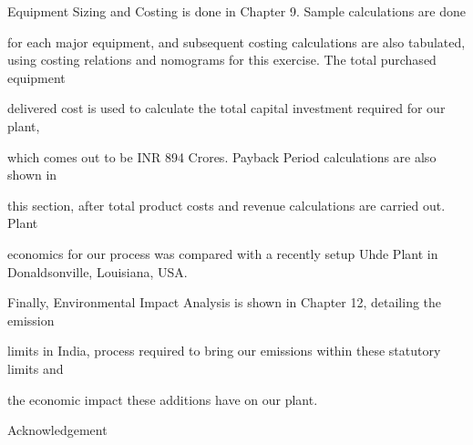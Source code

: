 \documentclass[a4paper,portrait,12pt]{article}
\begin{document}
\begin{flushleft}
Equipment Sizing and Costing is done in Chapter 9. Sample calculations are done
\end{flushleft}


\begin{flushleft}
for each major equipment, and subsequent costing calculations are also tabulated, using costing relations and nomograms for this exercise. The total purchased equipment
\end{flushleft}


\begin{flushleft}
delivered cost is used to calculate the total capital investment required for our plant,
\end{flushleft}


\begin{flushleft}
which comes out to be INR 894 Crores. Payback Period calculations are also shown in
\end{flushleft}


\begin{flushleft}
this section, after total product costs and revenue calculations are carried out. Plant
\end{flushleft}


\begin{flushleft}
economics for our process was compared with a recently setup Uhde Plant in Donaldsonville, Louisiana, USA.
\end{flushleft}





\begin{flushleft}
Finally, Environmental Impact Analysis is shown in Chapter 12, detailing the emission
\end{flushleft}


\begin{flushleft}
limits in India, process required to bring our emissions within these statutory limits and
\end{flushleft}


\begin{flushleft}
the economic impact these additions have on our plant.
\end{flushleft}





\begin{flushleft}
\newpage
Acknowledgement
\end{flushleft}
\end{document}
